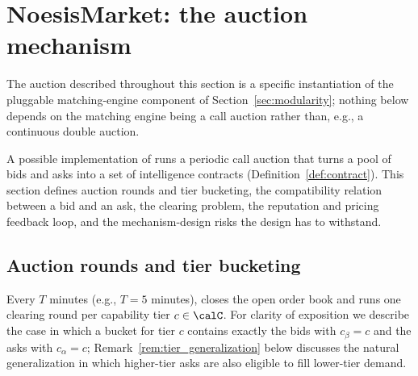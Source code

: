\section{NoesisMarket: the auction mechanism}
\label{sec:noesis_market}

The auction described throughout this section is a specific
instantiation of the pluggable matching-engine component of
Section~\ref{sec:modularity}; nothing below depends on the matching engine
being a call auction rather than, e.g., a continuous double auction.

A possible implementation of \NoesisMarket{} runs a periodic call auction that
turns a pool of bids and asks into a set of intelligence contracts
(Definition~\ref{def:contract}). This section defines auction rounds and tier
bucketing, the compatibility relation between a bid and an ask, the clearing
problem, the reputation and pricing feedback loop, and the mechanism-design
risks the design has to withstand. 

\subsection{Auction rounds and tier bucketing}
\label{sec:rounds}

Every $T$ minutes (e.g., $T = 5$ minutes), \NoesisMarket{} closes the open
order book and runs one clearing round per capability tier $c \in \calC$. For
clarity of exposition we describe the case in which a bucket for tier $c$
contains exactly the bids with $c_\beta = c$ and the asks with $c_\alpha = c$;
Remark~\ref{rem:tier_generalization} below discusses the natural generalization
in which higher-tier asks are also eligible to fill lower-tier demand.


